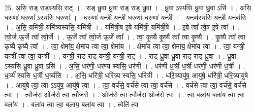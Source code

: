 \documentclass[17pt]{extarticle}
\begin{document}
25. अ॒सि॒ राड् राड॑स्यसि॒ राट् । . राड् ध्रु॒वा ध्रु॒वा राड् राड् ध्रु॒वा । . ध्रु॒वा ऽस्य॑सि ध्रु॒वा ध्रु॒वा ऽसि॑ । . अ॒सि॒ ध॒रुणा॑ ध॒रुणा᳚ ऽस्यसि ध॒रुणा᳚ । . ध॒रुणा॑ य॒न्त्री य॒न्त्री ध॒रुणा॑ ध॒रुणा॑ य॒न्त्री । . य॒न्त्र्य॑स्यसि य॒न्त्री य॒न्त्र्य॑सि । . अ॒सि॒ यमि॑त्री॒ यमि॑त्र्यस्यसि॒ यमि॑त्री । . यमि॑त्री॒ष इ॒षे यमि॑त्री॒ यमि॑त्री॒षे । . इ॒षे त्वा᳚ त्वे॒ष इ॒षे त्वा᳚ । . त्वो॒र्ज ऊ॒र्जे त्वा᳚ त्वो॒र्जे । . ऊ॒र्जे त्वा᳚ त्वो॒र्ज ऊ॒र्जे त्वा᳚ । . त्वा॒ कृ॒ष्यै कृ॒ष्यै त्वा᳚ त्वा कृ॒ष्यै । . कृ॒ष्यै त्वा᳚ त्वा कृ॒ष्यै कृ॒ष्यै त्वा᳚ । . त्वा॒ क्षेमा॑य॒ क्षेमा॑य त्वा त्वा॒ क्षेमा॑य । . क्षेमा॑य त्वा त्वा॒ क्षेमा॑य॒ क्षेमा॑य त्वा । . त्वा॒ यन्त्री॒ यन्त्री᳚ त्वा त्वा॒ यन्त्री᳚ । . यन्त्री॒ राड् राड् यन्त्री॒ यन्त्री॒ राट् । . राड् ध्रु॒वा ध्रु॒वा राड् राड् ध्रु॒वा । . ध्रु॒वा ऽस्य॑सि ध्रु॒वा ध्रु॒वा ऽसि॑ । . अ॒सि॒ धर॑णी॒ धर॑ण्य स्यसि॒ धर॑णी । . धर॑णी ध॒र्त्री ध॒र्त्री धर॑णी॒ धर॑णी ध॒र्त्री । . ध॒र्त्र्य॑ स्यसि ध॒र्त्री ध॒र्त्र्य॑सि । . अ॒सि॒ धरि॑त्री॒ धरि॑त्र्य स्यसि॒ धरि॑त्री । . धरि॒त्र्यायु॑ष॒ आयु॑षे॒ धरि॑त्री॒ धरि॒त्र्यायु॑षे । . आयु॑षे त्वा॒ त्वा ऽऽयु॑ष॒ आयु॑षे त्वा । . त्वा॒ वर्च॑से॒ वर्च॑से त्वा त्वा॒ वर्च॑से । . वर्च॑से त्वा त्वा॒ वर्च॑से॒ वर्च॑से त्वा । . त्वौज॑स॒ ओज॑से त्वा॒ त्वौज॑से । . ओज॑से त्वा॒ त्वौज॑स॒ ओज॑से त्वा । . त्वा॒ बला॑य॒ बला॑य त्वा त्वा॒ बला॑य । . बला॑य त्वा त्वा॒ बला॑य॒ बला॑य त्वा । . त्वेति॑ त्वा । \newline
\end{document}
